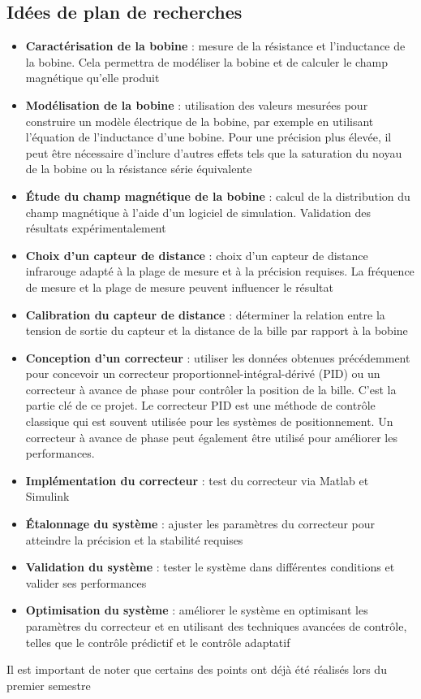 \documentclass[11pt,a4paper]{article}
\begin{document}
\subsection{Idées de plan de recherches}
\begin{itemize}
\item \textbf{Caractérisation de la bobine} : mesure de la résistance et l'inductance de la bobine. Cela permettra de modéliser la bobine et de calculer le champ magnétique qu'elle produit
\item \textbf{Modélisation de la bobine} : utilisation des valeurs mesurées pour construire un modèle électrique de la bobine, par exemple en utilisant l'équation de l'inductance d'une bobine. Pour une précision plus élevée, il peut être nécessaire d'inclure d'autres effets tels que la saturation du noyau de la bobine ou la résistance série équivalente
\item \textbf{Étude du champ magnétique de la bobine} : calcul de la distribution du champ magnétique à l'aide d'un logiciel de simulation. Validation des résultats expérimentalement
\item \textbf{Choix d'un capteur de distance} : choix d'un capteur de distance infrarouge adapté à la plage de mesure et à la précision requises. La fréquence de mesure et la plage de mesure peuvent influencer le résultat
\item \textbf{Calibration du capteur de distance} : déterminer la relation entre la tension de sortie du capteur et la distance de la bille par rapport à la bobine
\item \textbf{Conception d'un correcteur } : utiliser les données obtenues précédemment pour concevoir un correcteur proportionnel-intégral-dérivé (PID) ou un correcteur à avance de phase pour contrôler la position de la bille. C'est la partie clé de ce projet. Le correcteur PID est une méthode de contrôle classique qui est souvent utilisée pour les systèmes de positionnement. Un correcteur à avance de phase peut également être utilisé pour améliorer les performances.
\item \textbf{Implémentation du correcteur } : test du correcteur via Matlab et Simulink
\item \textbf{Étalonnage du système} : ajuster les paramètres du correcteur pour atteindre la précision et la stabilité requises
\item \textbf{Validation du système} : tester le système dans différentes conditions et valider ses performances
\item \textbf{Optimisation du système} : améliorer le système en optimisant les paramètres du correcteur et en utilisant des techniques avancées de contrôle, telles que le contrôle prédictif et le contrôle adaptatif
\end{itemize}
\medskip
Il est important de noter que certains des points ont déjà été réalisés lors du premier semestre
\end{document}
